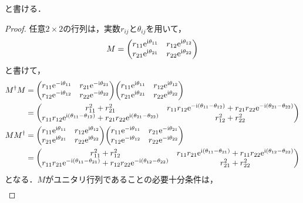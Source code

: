 \documentclass{report}
\begin{document}
    と書ける．
    \begin{proof}
      任意$2\times 2$の行列は，実数$r_{ij}$と$\theta_{ij}$を用いて，
      \begin{align}
        M = \mqty(
          r_{11}\e^{\i\theta_{11}} & r_{12}\e^{\i\theta_{12}} \\ 
          r_{21}\e^{\i\theta_{21}} & r_{22}\e^{\i\theta_{22}} \\ 
        )
      \end{align}
      と書けて，
      \begin{align}
        M^{\dag}M &= \mqty(
          r_{11}\e^{-\i\theta_{11}} & r_{21}\e^{-\i\theta_{21}} \\ 
          r_{12}\e^{-\i\theta_{12}} & r_{22}\e^{-\i\theta_{22}} \\ 
        )\mqty(
          r_{11}\e^{\i\theta_{11}} & r_{12}\e^{\i\theta_{12}} \\ 
          r_{21}\e^{\i\theta_{21}} & r_{22}\e^{\i\theta_{22}} \\ 
        ) \\ 
        &= \mqty(
          r_{11}^2 + r_{21}^2 & r_{11}r_{12}\e^{-\i(\theta_{11} - \theta_{12})} + r_{21}r_{22}\e^{-\i(\theta_{21} - \theta_{22})} \\ 
          r_{11}r_{12}\e^{\i(\theta_{11} - \theta_{12})} + r_{21}r_{22}\e^{\i(\theta_{21} - \theta_{22})} & r_{12}^2 + r_{22}^2 \\ 
        ) \\ 
        MM^{\dag} &= \mqty(
          r_{11}\e^{\i\theta_{11}} & r_{12}\e^{\i\theta_{12}} \\ 
          r_{21}\e^{\i\theta_{21}} & r_{22}\e^{\i\theta_{22}} \\ 
        )\mqty(
          r_{11}\e^{-\i\theta_{11}} & r_{21}\e^{-\i\theta_{21}} \\ 
          r_{12}\e^{-\i\theta_{12}} & r_{22}\e^{-\i\theta_{22}} \\ 
        ) \\ 
        &= \mqty(
          r_{11}^2 + r_{12}^2 & r_{11}r_{21}\e^{\i(\theta_{11} - \theta_{21})} + r_{11}r_{22}\e^{\i(\theta_{12} - \theta_{22})} \\ 
          r_{11}r_{21}\e^{-\i(\theta_{11} - \theta_{21})} + r_{12}r_{22}\e^{-\i(\theta_{12} - \theta_{22})} & r_{21}^2 + r_{22}^2 \\ 
        )
      \end{align}
      となる．$M$がユニタリ行列であることの必要十分条件は，
      \begin{align}

\end{align}
\end{proof}
\end{document}
